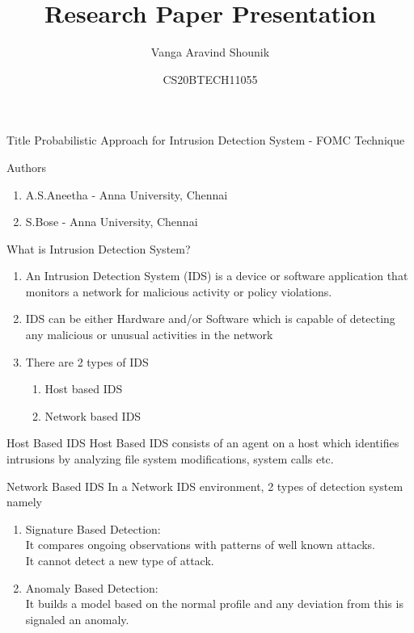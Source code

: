 \documentclass{beamer}
\title{Research Paper Presentation}
\author{Vanga Aravind Shounik}
\date{CS20BTECH11055}
\begin{document}
%
\begin{frame}
    \titlepage
\end{frame}

\begin{frame}
    \begin{block}{Title}
    Probabilistic Approach for Intrusion Detection System - FOMC Technique
    \end{block}
    \begin{block}{Authors}
    \begin{enumerate}
        \item A.S.Aneetha - Anna University, Chennai
        \item S.Bose - Anna University, Chennai
    \end{enumerate}
    \end{block}
\end{frame}

\begin{frame}{What is Intrusion Detection System?}
\begin{enumerate}
    \item An Intrusion Detection System (IDS) is a device or software application that monitors a network for malicious activity or policy violations.
    \item IDS can be either Hardware and/or Software which is capable of detecting any malicious or unusual activities in the network 
    \item There are 2 types of IDS 
    \begin{enumerate}
        \item Host based IDS
        \item Network based IDS
    \end{enumerate}
\end{enumerate}

\end{frame}
\begin{frame}
\begin{block}{Host Based IDS}
        Host Based IDS consists of an agent on a host which identifies intrusions by analyzing file system modifications, system calls etc.
\end{block}
\begin{block}{Network Based IDS}
    In a Network IDS environment, 2 types of detection system namely 
    \begin{enumerate}
        \item Signature Based Detection:\\
            It compares ongoing observations with patterns of well known attacks.\\
            It cannot detect a new type of attack.
        
        \item Anomaly Based Detection:\\
            It builds a model based on the normal profile and any deviation from this is signaled an anomaly.
    \end{enumerate}
\end{block}
\end{frame}
\end{document}
